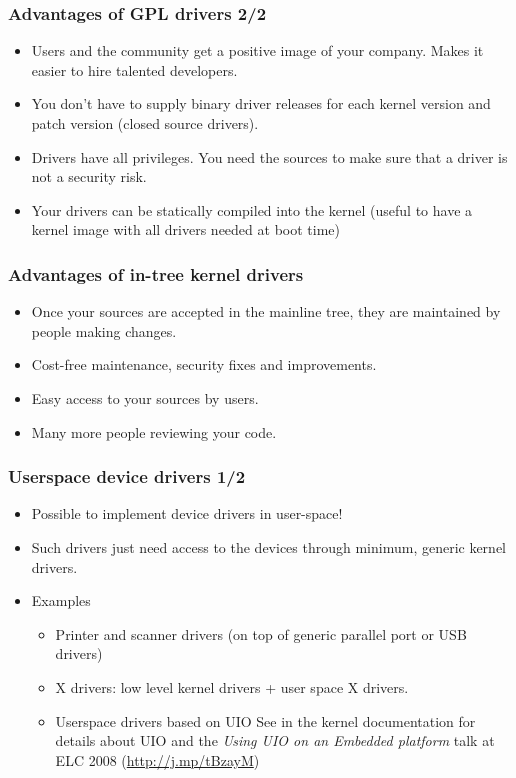 \begin{frame}
  \frametitle{Advantages of GPL drivers 2/2}
  \begin{itemize}
  \item Users and the community get a positive image of your
    company. Makes it easier to hire talented developers.
  \item You don't have to supply binary driver releases for each
    kernel version and patch version (closed source drivers).
  \item Drivers have all privileges. You need the sources to make sure
    that a driver is not a security risk.
  \item Your drivers can be statically compiled into the kernel
    (useful to have a kernel image with all drivers needed at boot time)
  \end{itemize}
\end{frame}

\begin{frame}
  \frametitle{Advantages of in-tree kernel drivers}
  \begin{itemize}
  \item Once your sources are accepted in the mainline tree, they are
    maintained by people making changes.
  \item Cost-free maintenance, security fixes and improvements.
  \item Easy access to your sources by users.
  \item Many more people reviewing your code.
  \end{itemize}
\end{frame}

\begin{frame}
  \frametitle{Userspace device drivers 1/2}
  \begin{itemize}
  \item Possible to implement device drivers in user-space!
  \item Such drivers just need access to the devices through minimum,
    generic kernel drivers.
  \item Examples
    \begin{itemize}
    \item Printer and scanner drivers (on top of generic parallel port
      or USB drivers)
    \item X drivers: low level kernel drivers + user space X drivers.
    \item Userspace drivers based on UIO See
      \href{http://free-electrons.com/kerneldoc/latest/DocBook/uio-howto/}
      {} in the kernel
      documentation for details about UIO and the \emph{Using UIO on
        an Embedded platform} talk at ELC 2008
        (\url{http://j.mp/tBzayM})
    \end{itemize}
  \end{itemize}
\end{frame}

